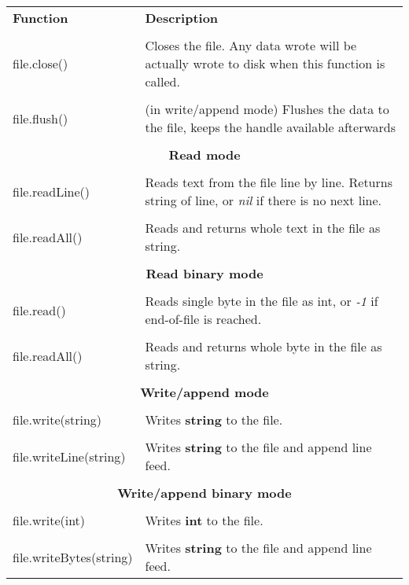 \begin{tabularx}{\textwidth}{l X}
	\textbf{\large Function} & \textbf{\large Description}
	\\ \\
	\endhead
	file.close() & Closes the file. Any data wrote will be actually wrote to disk when this function is called.
	\\ \\
	file.flush() & (in write/append mode) Flushes the data to the file, keeps the handle available afterwards
	\\ \\
	\multicolumn{2}{c}{\textbf{Read mode}}
	\\ \\ 
	file.readLine() & Reads text from the file line by line. Returns string of line, or \emph{nil} if there is no next line.
	\\ \\
	file.readAll() & Reads and returns whole text in the file as string.
	\\ \\
	\multicolumn{2}{c}{\textbf{Read binary mode}}
	\\ \\
	file.read() & Reads single byte in the file as int, or \emph{-1} if end-of-file is reached.
	\\ \\
	file.readAll() & Reads and returns whole byte in the file as string.
	\\ \\
	\multicolumn{2}{c}{\textbf{Write/append mode}}
	\\ \\
	file.write(string) & Writes \textbf{string} to the file.
	\\ \\
	file.writeLine(string) & Writes \textbf{string} to the file and append line feed.
	\\ \\
	\multicolumn{2}{c}{\textbf{Write/append binary mode}}
	\\ \\
	file.write(int) & Writes \textbf{int} to the file.
	\\ \\
	file.writeBytes(string) & Writes \textbf{string} to the file and append line feed.
\end{tabularx}
